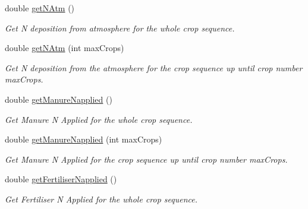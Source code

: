 \begin{DoxyCompactItemize}
double \mbox{\hyperlink{class_crop_sequence_class_ae39925ea474556830b1d10d17ba8637a}{get\+N\+Atm}} ()
\begin{DoxyCompactList}\small\item\em Get N deposition from atmosphere for the whole crop sequence. \end{DoxyCompactList}\item 
\mbox{\label{class_crop_sequence_class_ae6da92b63f5527310b369acc051f001a}} 
double \mbox{\hyperlink{class_crop_sequence_class_ae6da92b63f5527310b369acc051f001a}{get\+N\+Atm}} (int max\+Crops)
\begin{DoxyCompactList}\small\item\em Get N deposition from the atmosphere for the crop sequence up until crop number max\+Crops. \end{DoxyCompactList}\item 
\mbox{\label{class_crop_sequence_class_a065a47b85cc5dafc3ebdfea18b8981f9}} 
double \mbox{\hyperlink{class_crop_sequence_class_a065a47b85cc5dafc3ebdfea18b8981f9}{get\+Manure\+Napplied}} ()
\begin{DoxyCompactList}\small\item\em Get Manure N Applied for the whole crop sequence. \end{DoxyCompactList}\item 
\mbox{\label{class_crop_sequence_class_a7393fa642484080608936905b23c226d}} 
double \mbox{\hyperlink{class_crop_sequence_class_a7393fa642484080608936905b23c226d}{get\+Manure\+Napplied}} (int max\+Crops)
\begin{DoxyCompactList}\small\item\em Get Manure N Applied for the crop sequence up until crop number max\+Crops. \end{DoxyCompactList}\item 
\mbox{\label{class_crop_sequence_class_af4526f8f9ffcd16aa194f11e0de87e85}} 
double \mbox{\hyperlink{class_crop_sequence_class_af4526f8f9ffcd16aa194f11e0de87e85}{get\+Fertiliser\+Napplied}} ()
\begin{DoxyCompactList}\small\item\em Get Fertiliser N Applied for the whole crop sequence. \end{DoxyCompactList}\item 

\end{DoxyCompactItemize}
